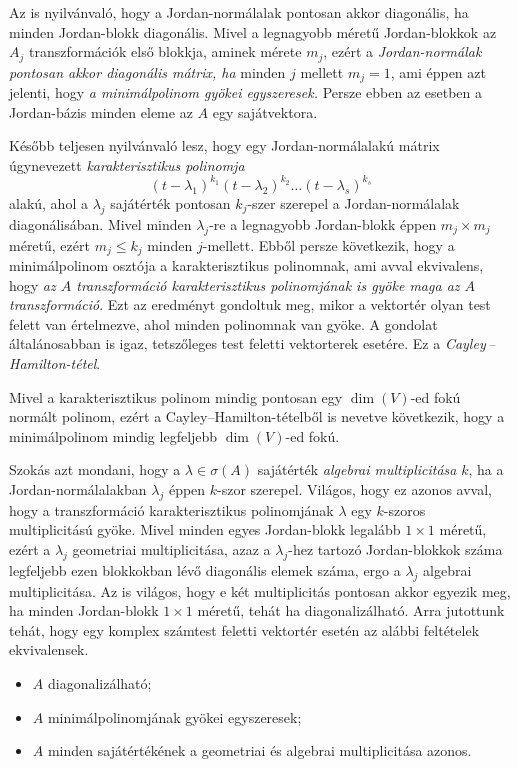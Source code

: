 \documentclass[9pt, a4paper, showtrims]{memoir}
\theoremstyle{plain}
\theoremstyle{remark}
\theoremstyle{definition}
\begin{document}
Az is nyilvánvaló, hogy a Jordan-normálalak pontosan akkor diagonális, ha minden Jordan-blokk diagonális.
Mivel a legnagyobb méretű Jordan-blokkok az $A_j$ transzformációk első blokkja, aminek mérete $m_j$, ezért a \emph{Jordan-normálak pontosan akkor diagonális mátrix, ha} minden $j$ mellett $m_j=1$,
ami éppen azt jelenti, hogy \emph{a minimálpolinom gyökei egyszeresek.}
Persze ebben az esetben a Jordan-bázis minden eleme az $A$ egy sajátvektora.

Később teljesen nyilvánvaló lesz, hogy egy Jordan-normálalakú mátrix
úgynevezett \emph{karakterisztikus polinomja}
\[
	\left( t-\lambda_1 \right)^{k_1}\left( t-\lambda_2 \right)^{k_2}\dots\left( t-\lambda_s \right)^{k_s}
\]
alakú,
ahol a $\lambda_j$ sajátérték pontosan $k_j$-szer szerepel a Jordan-normálalak diagonálisában.
Mivel minden $\lambda_j$-re a legnagyobb Jordan-blokk éppen $m_j\times m_j$ méretű,
ezért $m_j\leq k_j$ minden $j$-mellett.
Ebből persze következik,
hogy a minimálpolinom osztója a karakterisztikus polinomnak, ami
avval ekvivalens,
hogy \emph{az $A$ transzformáció karakterisztikus polinomjának is gyöke maga az $A$ transzformáció}.
Ezt az eredményt gondoltuk meg, mikor a vektortér olyan test felett van értelmezve,
ahol minden polinomnak van gyöke.
A gondolat általánosabban is igaz, tetszőleges test feletti vektorterek esetére.
Ez a \emph{Cayley\,--\,Hamilton-tétel}.

Mivel a karakterisztikus polinom mindig pontosan egy $\dim(V)$-ed fokú normált polinom,
ezért a Cayley--Hamilton-tételből is nevetve következik,
hogy a minimálpolinom mindig legfeljebb $\dim(V)$-ed fokú.

Szokás azt mondani, hogy a $\lambda\in\sigma\left( A \right)$ sajátérték
\emph{algebrai multiplicitása} $k$,
ha a Jordan-normálalakban $\lambda_j$ éppen $k$-szor szerepel.
Világos, hogy ez azonos avval, hogy a transzformáció karakterisztikus polinomjának
$\lambda$ egy $k$-szoros multiplicitású gyöke.
Mivel minden egyes Jordan-blokk legalább $1\times 1$ méretű,
ezért a $\lambda_j$ geometriai multiplicitása,
azaz a $\lambda_j$-hez tartozó Jordan-blokkok száma legfeljebb ezen blokkokban lévő diagonális elemek száma,
ergo a $\lambda_j$ algebrai multiplicitása.
Az is világos, hogy e két multiplicitás pontosan akkor egyezik meg,
ha minden Jordan-blokk $1\times 1$ méretű, tehát ha diagonalizálható.
Arra jutottunk tehát,
hogy egy komplex számtest feletti vektortér esetén az alábbi feltételek ekvivalensek.
\begin{itemize}\tightlist
	\item[\textendash] $A$ diagonalizálható;
	\item[\textendash] $A$ minimálpolinomjának gyökei egyszeresek;
	\item[\textendash] $A$ minden sajátértékének a geometriai és algebrai multiplicitása azonos.
\end{itemize}
\end{document}
